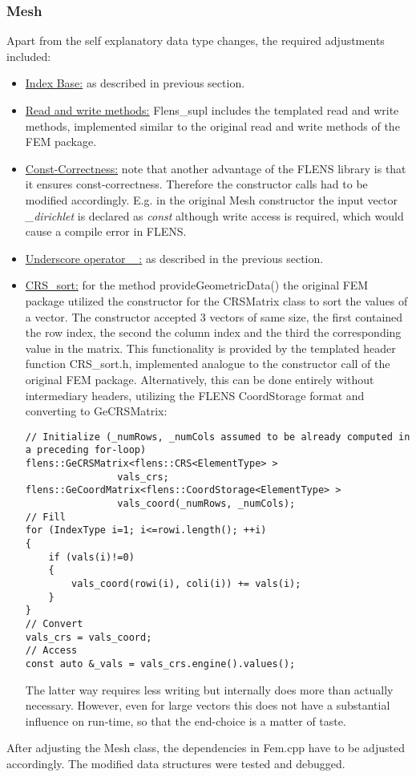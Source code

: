 \subsubsection{Mesh}
Apart from the self explanatory data type changes, the required adjustments included:
\begin{itemize}
\item \underline{Index Base:} as described in previous section.
\item \underline{Read and write methods:} Flens\_supl includes the templated read and write methods, implemented similar to the original read and write methods of the FEM package.
\item \underline{Const-Correctness:} note that another advantage of the FLENS library is that it ensures const-correctness. Therefore the constructor calls had to be modified accordingly. E.g. in the original Mesh constructor the input vector \emph{\_dirichlet} is declared as \emph{const} although write access is required, which would cause a compile error in FLENS.
\item \underline{Underscore operator \textbf{\_}:} as described in the previous section.
\item \underline{CRS\_sort:} for the method provideGeometricData() the original FEM package utilized the constructor for the CRSMatrix class to sort the values of a vector. The constructor accepted 3 vectors of same size, the first contained the row index, the second the column index and the third the corresponding value in the matrix. This functionality is provided by the templated header function CRS\_sort.h, implemented analogue to the constructor call of the original FEM package. Alternatively, this can be done entirely without intermediary headers, utilizing the FLENS CoordStorage format and converting to GeCRSMatrix:

\begin{lstlisting}
// Initialize (_numRows, _numCols assumed to be already computed in a preceding for-loop)
flens::GeCRSMatrix<flens::CRS<ElementType> >
				vals_crs;
flens::GeCoordMatrix<flens::CoordStorage<ElementType> >
				vals_coord(_numRows, _numCols);
// Fill
for (IndexType i=1; i<=rowi.length(); ++i)
{
	if (vals(i)!=0)
	{
		vals_coord(rowi(i), coli(i)) += vals(i);	
	}
}
// Convert
vals_crs = vals_coord;
// Access
const auto &_vals = vals_crs.engine().values();
\end{lstlisting}
The latter way requires less writing but internally does more than actually necessary. However, even for large vectors this does not have a substantial influence on run-time, so that the end-choice is a matter of taste.
\end{itemize}
After adjusting the Mesh class, the dependencies in Fem.cpp have to be adjusted accordingly. The modified data structures were tested and debugged.

